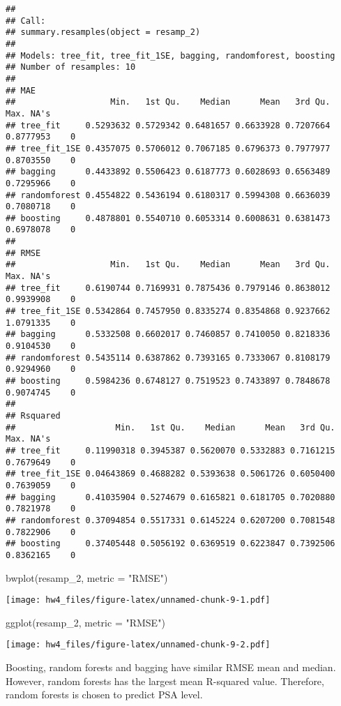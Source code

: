 \documentclass[
]{article}
\newenvironment{Shaded}{\begin{snugshade}}{\end{snugshade}}
\newcommand{\AttributeTok}[1]{\textcolor[rgb]{0.77,0.63,0.00}{#1}}
\newcommand{\FunctionTok}[1]{\textcolor[rgb]{0.00,0.00,0.00}{#1}}
\newcommand{\NormalTok}[1]{#1}
\newcommand{\StringTok}[1]{\textcolor[rgb]{0.31,0.60,0.02}{#1}}
\begin{document}
\begin{verbatim}
## 
## Call:
## summary.resamples(object = resamp_2)
## 
## Models: tree_fit, tree_fit_1SE, bagging, randomforest, boosting 
## Number of resamples: 10 
## 
## MAE 
##                   Min.   1st Qu.    Median      Mean   3rd Qu.      Max. NA's
## tree_fit     0.5293632 0.5729342 0.6481657 0.6633928 0.7207664 0.8777953    0
## tree_fit_1SE 0.4357075 0.5706012 0.7067185 0.6796373 0.7977977 0.8703550    0
## bagging      0.4433892 0.5506423 0.6187773 0.6028693 0.6563489 0.7295966    0
## randomforest 0.4554822 0.5436194 0.6180317 0.5994308 0.6636039 0.7080718    0
## boosting     0.4878801 0.5540710 0.6053314 0.6008631 0.6381473 0.6978078    0
## 
## RMSE 
##                   Min.   1st Qu.    Median      Mean   3rd Qu.      Max. NA's
## tree_fit     0.6190744 0.7169931 0.7875436 0.7979146 0.8638012 0.9939908    0
## tree_fit_1SE 0.5342864 0.7457950 0.8335274 0.8354868 0.9237662 1.0791335    0
## bagging      0.5332508 0.6602017 0.7460857 0.7410050 0.8218336 0.9104530    0
## randomforest 0.5435114 0.6387862 0.7393165 0.7333067 0.8108179 0.9294960    0
## boosting     0.5984236 0.6748127 0.7519523 0.7433897 0.7848678 0.9074745    0
## 
## Rsquared 
##                    Min.   1st Qu.    Median      Mean   3rd Qu.      Max. NA's
## tree_fit     0.11990318 0.3945387 0.5620070 0.5332883 0.7161215 0.7679649    0
## tree_fit_1SE 0.04643869 0.4688282 0.5393638 0.5061726 0.6050400 0.7639059    0
## bagging      0.41035904 0.5274679 0.6165821 0.6181705 0.7020880 0.7821978    0
## randomforest 0.37094854 0.5517331 0.6145224 0.6207200 0.7081548 0.7822906    0
## boosting     0.37405448 0.5056192 0.6369519 0.6223847 0.7392506 0.8362165    0
\end{verbatim}

\begin{Shaded}
\begin{Highlighting}[]
\FunctionTok{bwplot}\NormalTok{(resamp\_2, }\AttributeTok{metric =} \StringTok{"RMSE"}\NormalTok{)}
\end{Highlighting}
\end{Shaded}

\texttt{[image: hw4\_files/figure-latex/unnamed-chunk-9-1.pdf]}

\begin{Shaded}
\begin{Highlighting}[]
\FunctionTok{ggplot}\NormalTok{(resamp\_2, }\AttributeTok{metric =} \StringTok{"RMSE"}\NormalTok{)}
\end{Highlighting}
\end{Shaded}

\texttt{[image: hw4\_files/figure-latex/unnamed-chunk-9-2.pdf]}

Boosting, random forests and bagging have similar RMSE mean and median.
However, random forests has the largest mean R-squared value. Therefore,
random forests is chosen to predict PSA level.
\end{document}
